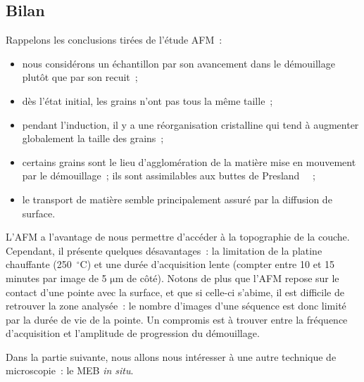 \subsection{Bilan}

Rappelons les conclusions tirées de l'étude AFM~:
\begin{itemize}
\item nous considérons un échantillon par son avancement dans le démouillage plutôt que par son recuit~;
\item dès l'état initial, les grains n'ont pas tous la même taille~;
\item pendant l'induction, il y a une réorganisation cristalline qui tend à augmenter globalement la taille des grains~;
\item certains grains sont le lieu d'agglomération de la matière mise en mouvement par le démouillage~; ils sont assimilables aux \og buttes \fg{} de Presland~\cite{presland1972hillock} ~;
\item le transport de matière semble principalement assuré par la diffusion de surface.
\end{itemize}
L'AFM a l'avantage de nous permettre d'accéder à la topographie de la couche. Cependant, il présente quelques désavantages~: la limitation de la platine chauffante (250~$^\circ$C) et une durée d'acquisition lente (compter entre 10 et 15 minutes par image de 5 $\mathrm{\mu m}$ de côté). Notons de plus que l'AFM repose sur le contact d'une pointe avec la surface, et que si celle-ci s'abime, il est difficile de retrouver la zone analysée~: le nombre d'images d'une séquence est donc limité par la durée de vie de la pointe. Un compromis est à trouver entre la fréquence d'acquisition et l'amplitude de progression du démouillage.\par 
Dans la partie suivante, nous allons nous intéresser à une autre technique de microscopie~: le MEB \textit{in situ}. 



